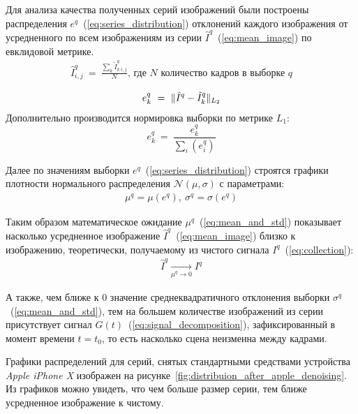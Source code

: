 \documentclass[14pt]{mmcs_article}
\begin{document}
Для анализа качества полученных серий изображений были построены распределения $e^q$~(\ref{eq:series_distribution}) отклонений каждого изображения от усредненного по всем изображениям из серии $\hat{I}^q$~(\ref{eq:mean_image}) по евклидовой метрике.
\begin{eqnarray}\label{eq:mean_image}
\hat{I}^q_{i,j}\ =\ \frac{\sum_{k}\tilde{I}^q_{k\ i,j}}{N}\text{, где }N\text{ количество кадров в выборке }q
\end{eqnarray}

\begin{eqnarray}\label{eq:series_distribution}
e^q_k\ =\ \Arrowvert \hat{I}^q - \tilde{I}^q_k \Arrowvert_{L_2}
\end{eqnarray}
Дополнительно производится нормировка выборки по метрике $L_1$:
$$e^q_k\ =\ \frac{e^q_k}{\sum_{i}(e^q_i)}$$

Далее по значениям выборки $e^q$~(\ref{eq:series_distribution}) строятся графики плотности нормального распределения $\mathcal{N}(\mu, \sigma)$ с параметрами:
\begin{eqnarray}\label{eq:mean_and_std}
\mu^q = \mu(e^q),\ \sigma^q = \sigma(e^q)
\end{eqnarray}

Таким образом математическое ожидание $\mu^q$~(\ref{eq:mean_and_std}) показывает насколько усредненное изображение $\hat{I}^q$~(\ref{eq:mean_image}) близко к изображению, теоретически, получаемому из чистого сигнала $I^q$~(\ref{eq:collection}): 
\begin{eqnarray}\label{eq:mean_image_approximation}
\hat{I}^q \xrightarrow[\mu^q \rightarrow 0]{} I^q
\end{eqnarray}

А также, чем ближе к $0$ значение среднеквадратичного отклонения выборки $\sigma^q$~(\ref{eq:mean_and_std}), тем на большем количестве изображений из серии присутствует сигнал $G(t)$~(\ref{eq:signal_decomposition}), зафиксированный в момент времени $t = t_0$, то есть насколько сцена неизменна между кадрами.

Графики распределений для серий, снятых стандартными средствами устройства \textit{Apple iPhone X} изображен на рисунке~\ref{fig:distribuion_after_apple_denoising}. Из графиков можно увидеть, что чем больше размер серии, тем ближе усредненное изображение к чистому.
\end{document}

